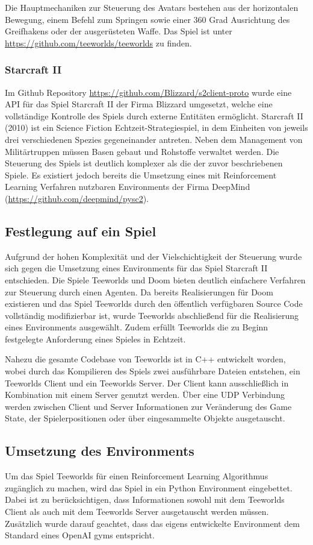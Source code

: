 \documentclass[11pt]{scrartcl}
\begin{document}
Die Hauptmechaniken zur Steuerung des Avatars bestehen aus der horizontalen Bewegung, einem Befehl
zum Springen sowie einer 360 Grad Ausrichtung des Greifhakens oder der ausgerüsteten Waffe.
Das Spiel ist unter \url{https://github.com/teeworlds/teeworlds} zu finden.

\subsubsection{Starcraft II}
Im Github Repository \url{https://github.com/Blizzard/s2client-proto} wurde eine API für das Spiel
Starcraft II der Firma Blizzard umgesetzt, welche eine vollständige Kontrolle des Spiels durch
externe Entitäten ermöglicht. Starcraft II (2010) ist ein Science Fiction Echtzeit-Strategiespiel,
in dem Einheiten von jeweils drei verschiedenen Spezies gegeneinander antreten. Neben dem
Management von Militärtruppen müssen Basen gebaut und Rohstoffe verwaltet werden. Die Steuerung
des Spiels ist deutlich komplexer als die der zuvor beschriebenen Spiele. Es existiert jedoch
bereits die Umsetzung eines mit Reinforcement Learning Verfahren nutzbaren Environments der Firma
DeepMind (\url{https://github.com/deepmind/pysc2}). 

\subsection{Festlegung auf ein Spiel}
Aufgrund der hohen Komplexität und der Vielschichtigkeit der Steuerung wurde sich gegen die Umsetzung
eines Environments für das Spiel Starcraft II entschieden. Die Spiele Teeworlds und Doom bieten
deutlich einfachere Verfahren zur Steuerung durch einen Agenten. Da bereits Realisierungen für Doom
existieren und das Spiel Teeworlds durch den öffentlich verfügbaren Source Code vollständig modifizierbar
ist, wurde Teeworlds abschließend für die Realisierung eines Environments ausgewählt. Zudem erfüllt
Teeworlds die zu Beginn festgelegte Anforderung eines Spieles in Echtzeit.

Nahezu die gesamte Codebase von Teeworlds ist in C++ entwickelt worden, wobei durch das Kompilieren
des Spiels zwei ausführbare Dateien entstehen, ein Teeworlds Client und ein Teeworlds Server. Der
Client kann ausschließlich in Kombination mit einem Server genutzt werden. Über eine UDP Verbindung
werden zwischen Client und Server Informationen zur Veränderung des Game State, der Spielerpositionen
oder über eingesammelte Objekte ausgetauscht.

\subsection{Umsetzung des Environments}
Um das Spiel Teeworlds für einen Reinforcement Learning Algorithmus zugänglich zu machen,
wird das Spiel in ein Python Environment eingebettet. Dabei ist zu be\-rück\-sich\-ti\-gen, dass
Informationen sowohl mit dem Teeworlds Client als auch mit dem Teeworlds Server ausgetauscht
werden müssen. Zusätzlich wurde darauf geachtet, dass das eigens entwickelte Environment dem
Standard eines OpenAI gyms entspricht.
\end{document}
